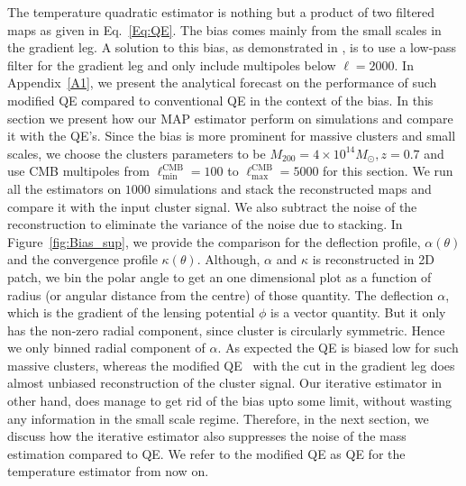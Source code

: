 \documentclass[prd, superscriptaddress, tightenlines, longbibliography, nofootinbib, eqsecnum, amsfonts, amsmath, floatfix, twocolumn, notitlepage]{revtex4-2}
\begin{document}
The temperature quadratic estimator is nothing but a product of two filtered maps as given in Eq.~\ref{Eq:QE}. The bias comes mainly from the small scales in the gradient leg. A solution to this bias, as demonstrated in \cite{Hu:2007bt}, is to use a low-pass filter for the gradient leg and only include multipoles below $\ell=2000$. In Appendix~\ref{A1}, we present the analytical forecast on the performance of such modified QE compared to conventional QE in the context of the bias. In this section we present how our MAP estimator perform on simulations and compare it with the QE's. Since the bias is more prominent for massive clusters and small scales, we choose the clusters parameters to be $M_{200} = 4 \times 10^{14} M_{\odot}, z=0.7$ and use CMB multipoles from $\ell_{\text{min}}^{\text{CMB}}=100$ to $\ell_{\text{max}}^{\text{CMB}} = 5000$ for this section. We run all the estimators on $1000$ simulations and stack the reconstructed maps and compare it with the input cluster signal. We also subtract the noise of the reconstruction to eliminate the variance of the noise due to stacking. In Figure~\ref{fig:Bias_sup}, we provide the comparison for the deflection profile, $\alpha(\theta)$  and the convergence profile $\kappa (\theta)$. Although, $\alpha$ and $\kappa$ is reconstructed in 2D patch, we bin the polar angle to get an one dimensional plot as a function of radius (or angular distance from the centre) of those quantity. The deflection $\alpha$, which is the gradient of the lensing potential $\phi$ is a vector quantity. But it only has the non-zero radial component, since cluster is circularly symmetric. Hence we only binned radial component of $\alpha$. As expected the QE is biased low for such massive clusters, whereas the modified QE~\cite{Hu:2007bt} with the cut in the gradient leg does almost unbiased reconstruction of the cluster signal. Our iterative estimator in other hand, does manage to get rid of the bias upto some limit, without wasting any information in the small scale regime. Therefore, in the next section, we discuss how the iterative estimator also suppresses the noise of the mass estimation compared to QE. We refer to the modified QE as QE for the temperature estimator from now on.
\end{document}
